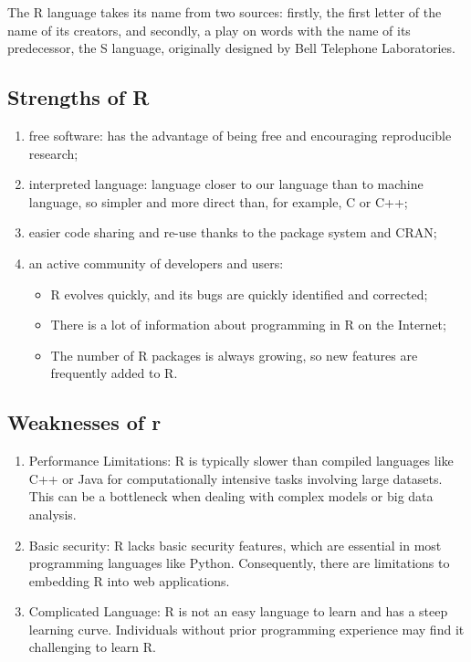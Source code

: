 \documentclass[
]{book}
\providecommand{\tightlist}{%
  \setlength{\itemsep}{0pt}\setlength{\parskip}{0pt}}
\begin{document}
The R language takes its name from two sources: firstly, the first letter of the name of its creators, and secondly, a play on words with the name of its predecessor, the S language, originally designed by Bell Telephone Laboratories.

\hypertarget{strengths-of-r}{%
\subsection*{Strengths of R}\label{strengths-of-r}}

\begin{enumerate}
\def\labelenumi{\arabic{enumi}.}
\item
  free software: has the advantage of being free and encouraging reproducible research;
\item
  interpreted language: language closer to our language than to machine language, so simpler and more direct than, for example, C or C++;
\item
  easier code sharing and re-use thanks to the package system and CRAN;
\item
  an active community of developers and users:

  \begin{itemize}
  \tightlist
  \item
    R evolves quickly, and its bugs are quickly identified and corrected;
  \item
    There is a lot of information about programming in R on the Internet;
  \item
    The number of R packages is always growing, so new features are frequently added to R.
  \end{itemize}
\end{enumerate}

\hypertarget{weaknesses-of-r}{%
\subsection*{Weaknesses of r}\label{weaknesses-of-r}}

\begin{enumerate}
\def\labelenumi{\arabic{enumi}.}
\tightlist
\item
  Performance Limitations: R is typically slower than compiled languages like C++ or Java for computationally intensive tasks involving large datasets. This can be a bottleneck when dealing with complex models or big data analysis.
\item
  Basic security: R lacks basic security features, which are essential in most programming languages like Python. Consequently, there are limitations to embedding R into web applications.
\item
  Complicated Language: R is not an easy language to learn and has a steep learning curve. Individuals without prior programming experience may find it challenging to learn R.
\end{enumerate}
\end{document}
